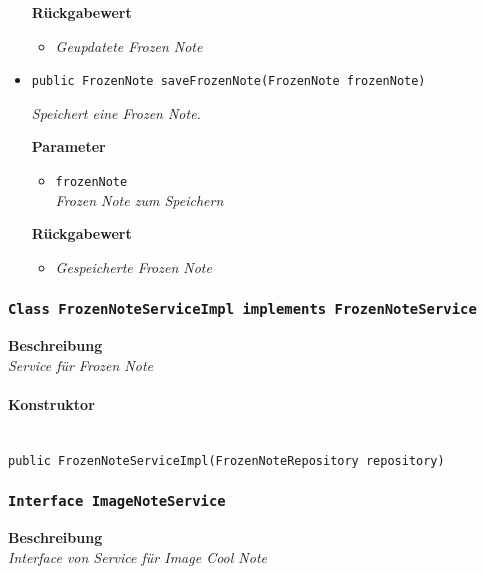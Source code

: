 \begin{itemize}
     	\textbf{Rückgabewert}
     	\begin{itemize}
     		\item\textit{Geupdatete Frozen Note}
     	\end{itemize}
     
     \item{\texttt{public FrozenNote saveFrozenNote(FrozenNote frozenNote)}}
     	
     	\textit{Speichert eine Frozen Note.}
     	
     	\textbf{Parameter}
     	\begin{itemize}
     		\item\texttt{frozenNote}\\
     		\textit{Frozen Note zum Speichern}
     	\end{itemize}
     
     	\textbf{Rückgabewert}
     	\begin{itemize}
     		\item\textit{Gespeicherte Frozen Note}
     	\end{itemize}
     \end{itemize}
     \subsubsection{\texttt{Class FrozenNoteServiceImpl implements FrozenNoteService}}
     \textbf{Beschreibung} \\
     \textit{Service für Frozen Note}
     \paragraph*{Konstruktor}\mbox{} \\
     \texttt{public FrozenNoteServiceImpl(FrozenNoteRepository repository)}
     \subsubsection{\texttt{Interface ImageNoteService}}
     \textbf{Beschreibung} \\
     \textit{Interface von Service für Image Cool Note}
